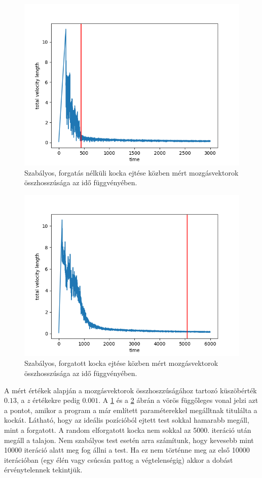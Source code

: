 \begin{figure}[h!]
	\centering
	\includegraphics[scale=0.7]{images/cube_normal_3000.png}
	\caption{Szabályos, forgatás nélküli kocka ejtése közben mért mozgásvektorok összhosszúsága az idő függvényében.}
	\label{fig:cn3000}
\end{figure}
\begin{figure}[h!]
	\centering
	\includegraphics[scale=0.7]{images/cube_rotated_6000.png}
	\caption{Szabályos, forgatott kocka ejtése közben mért mozgásvektorok összhosszúsága az idő függvényében.}
	\label{fig:cr6000}
\end{figure}
A mért értékek alapján a mozgásvektorok összhoszzúságához tartozó küszöbérték $0.13$, a $z$ értékekre pedig $0.001$.
A \ref{fig:cn3000} és a \ref{fig:cr6000} ábrán a vörös függőleges vonal jelzi azt a pontot, amikor a program a már említett paraméterekkel megálltnak titulálta a kockát.
Látható, hogy az ideális pozícióból ejtett test sokkal hamarabb megáll, mint a forgatott.
A random elforgatott kocka nem sokkal az 5000. iteráció után megáll a talajon.
Nem szabályos test esetén arra számítunk, hogy kevesebb mint 10000 iteráció alatt meg fog állni a test.
Ha ez nem történne meg az első 10000 iterációban (egy élén vagy csúcsán pattog a végtelenségig) akkor a dobást érvénytelennek tekintjük.

